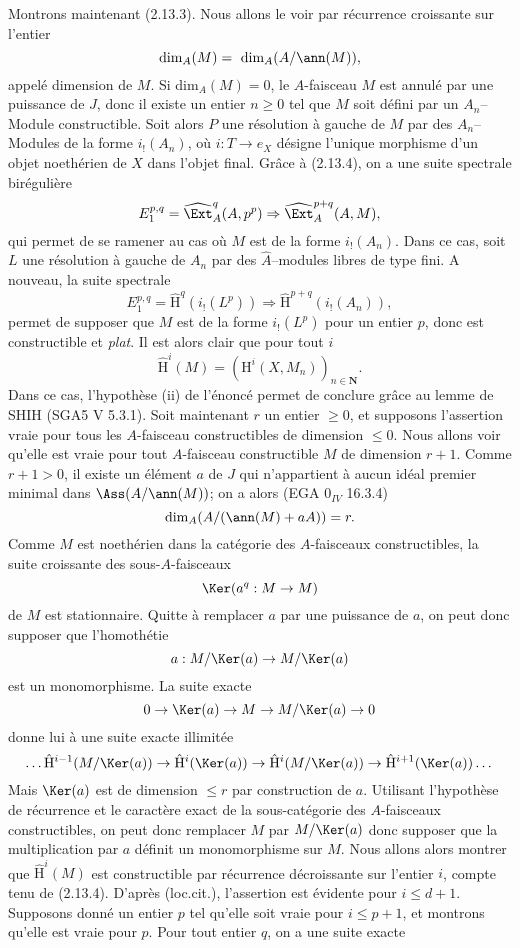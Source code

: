 Montrons maintenant (2.13.3). Nous allons le voir par récurrence croissante sur l'entier
$$
\text{dim}_A(M) =~\text{dim}_A(A/\ann(M)), 
$$
appelé dimension de $M$. Si dim$_A(M) = 0$, le $A$-faisceau $M$ est annulé par une puissance de $J$, donc il existe un entier $n \geq 0$ tel que $M$ soit défini par un $A_n$--Module constructible. Soit alors $P$ une résolution à gauche de $M$ par des $A_n$--Modules de la forme $i_!(A_n)$, où $i: T \to e_X$ désigne l'unique morphisme d'un objet noethérien de $X$ dans l'objet final. Grâce à (2.13.4), on a une suite spectrale birégulière
$$
E^{p, q}_1 = \widehat{\Ext}^q_A(A, p^p) \Rightarrow \widehat{\Ext}^{p+q}_A(A, M),
$$
qui permet de se ramener au cas où $M$ est de la forme $i_!(A_n)$. Dans ce cas, soit $L$ une résolution à gauche de $A_n$ par des $\hat{A}$--modules libres de type fini. A nouveau, la suite spectrale
$$
E^{p, q}_1 = \hat{\mathrm{H}}^q(i_!(L^p)) \Rightarrow \hat{\mathrm{H}}^{p+q}(i_!(A_n)),
$$
permet de supposer que $M$ est de la forme $i_!(L^p)$ pour un entier $p$, donc est constructible et \emph{plat}. Il est alors clair que pour tout $i$
$$
\hat{\mathrm{H}}^i(M) = (\mathrm{H}^i(X, M_n))_{n \in \mathbf{N}}.
$$
Dans ce cas, l'hypothèse (ii) de l'énoncé permet de conclure grâce au lemme de SHIH (SGA5 V 5.3.1). Soit maintenant $r$ un entier $\geq 0$, et supposons l'assertion vraie pour tous les $A$-faisceau constructibles de dimension $\leq 0$. Nous allons voir qu'elle est vraie pour tout $A$-faisceau constructible $M$ de dimension $r+1$. Comme $r+1 > 0$, il existe un élément $a$ de $J$ qui n'appartient à aucun idéal premier minimal dans $\Ass(A/\ann(M))$; on a alors (EGA $0_{IV}$ 16.3.4)
$$
\text{dim}_A(A/(\ann(M) + aA)) = r.
$$
Comme $M$ est noethérien dans la catégorie des $A$-faisceaux constructibles, la suite croissante des sous-$A$-faisceaux
$$
\Ker(a^q: M \to M)
$$
de $M$ est stationnaire. Quitte à remplacer $a$ par une puissance de $a$, on peut donc supposer que l'homothétie
$$
a: M/\Ker(a) \to M/\Ker(a)
$$
est un monomorphisme. La suite exacte
$$
0 \to \Ker(a) \to M \to M/\Ker(a) \to 0
$$
donne lui à une suite exacte illimitée
$$
\dots \hat{\mathrm{H}}^{i-1}(M/\Ker(a)) \to \hat{\mathrm{H}}^i(\Ker(a)) \to \hat{\mathrm{H}}^i(M/\Ker(a)) \to \hat{\mathrm{H}}^{i+1}(\Ker(a)) \dots 
$$
Mais $\Ker(a)$ est de dimension $\leq r$ par construction de $a$. Utilisant l'hypothèse de récurrence et le caractère exact de la sous-catégorie des $A$-faisceaux constructibles, on peut donc remplacer $M$ par $M/\Ker(a)$ donc supposer que la multiplication par $a$ définit un monomorphisme sur $M$. Nous allons alors montrer que $\hat{\mathrm{H}}^i(M)$ est constructible par récurrence décroissante sur l'entier $i$, compte tenu de (2.13.4). D'après (loc.cit.), l'assertion est évidente pour $i \leq d+1$. Supposons donné un entier $p$ tel qu'elle soit vraie pour $i \leq p+1$, et montrons qu'elle est vraie pour $p$. Pour tout entier $q$, on a une suite exacte
